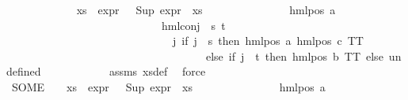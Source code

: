 \begin{isabellebody}
\ \ \ \ \ \ \isamarkupfalse%
\ {\isachardoublequoteopen}{\isacharbraceleft}{\kern0pt}{\isasympsi}\ {\isacharbar}{\kern0pt}\ {\isasympsi}{\isachardot}{\kern0pt}\ {\isasympsi}\ {\isasymin}\ xs\ {\isasymand}\ {\isacharparenleft}{\kern0pt}expr{\isacharunderscore}{\kern0pt}{}\ {\isasympsi}\ {\isacharequal}{\kern0pt}\ {\isacharparenleft}{\kern0pt}Sup\ {\isacharparenleft}{\kern0pt}expr{\isacharunderscore}{\kern0pt}{}\ {\isacharbackquote}{\kern0pt}\ xs{\isacharparenright}{\kern0pt}{\isacharparenright}{\kern0pt}{\isacharparenright}{\kern0pt}{\isacharbraceright}{\kern0pt}\ {\isacharequal}{\kern0pt}\isanewline
\ \ \ \ \ \ \ \ \ \ \ \ \ \ {\isacharbraceleft}{\kern0pt}{\isacharparenleft}{\kern0pt}hml{\isacharunderscore}{\kern0pt}pos\ a\isanewline
\ \ \ \ \ \ \ \ \ \ \ \ \ \ \ \ \ \ \ \ \ \ \ \ \ \ \ \ {\isacharparenleft}{\kern0pt}hml{\isacharunderscore}{\kern0pt}conj\ {\isacharbraceleft}{\kern0pt}{\isacharbraceright}{\kern0pt}\ {\isacharbraceleft}{\kern0pt}s{\isacharcomma}{\kern0pt}\ t{\isacharbraceright}{\kern0pt}\isanewline
\ \ \ \ \ \ \ \ \ \ \ \ \ \ \ \ \ \ \ \ \ \ \ \ \ \ \ \ \ \ {\isacharparenleft}{\kern0pt}{\isasymlambda}j{\isachardot}{\kern0pt}\ if\ j\ {\isacharequal}{\kern0pt}\ s\ then\ hml{\isacharunderscore}{\kern0pt}pos\ a\ {\isacharparenleft}{\kern0pt}hml{\isacharunderscore}{\kern0pt}pos\ c\ TT{\isacharparenright}{\kern0pt}\isanewline
\ \ \ \ \ \ \ \ \ \ \ \ \ \ \ \ \ \ \ \ \ \ \ \ \ \ \ \ \ \ \ \ \ \ \ \ else\ if\ j\ {\isacharequal}{\kern0pt}\ t\ then\ hml{\isacharunderscore}{\kern0pt}pos\ b\ TT\ else\ undefined{\isacharparenright}{\kern0pt}{\isacharparenright}{\kern0pt}{\isacharparenright}{\kern0pt}{\isacharbraceright}{\kern0pt}{\isachardoublequoteclose}\isanewline
\ \ \ \ \ \ \ \ \isamarkupfalse%
\ {}\ {}\ assms{\isacharparenleft}{\kern0pt}{}{\isacharparenright}{\kern0pt}\ xs{\isacharunderscore}{\kern0pt}def\ \isamarkupfalse%
\ force\isanewline
\ \ \ \ \ \ \isamarkupfalse%
\ {\isachardoublequoteopen}{\isacharparenleft}{\kern0pt}SOME\ {\isasympsi}{\isachardot}{\kern0pt}\ {\isasympsi}\ {\isasymin}\ xs\ {\isasymand}\ expr{\isacharunderscore}{\kern0pt}{}\ {\isasympsi}\ {\isacharequal}{\kern0pt}\ {\isacharparenleft}{\kern0pt}Sup\ {\isacharparenleft}{\kern0pt}expr{\isacharunderscore}{\kern0pt}{}\ {\isacharbackquote}{\kern0pt}\ xs{\isacharparenright}{\kern0pt}{\isacharparenright}{\kern0pt}{\isacharparenright}{\kern0pt}\ {\isacharequal}{\kern0pt}\isanewline
\ \ \ \ \ \ \ \ \ \ \ \ \ \ {\isacharparenleft}{\kern0pt}hml{\isacharunderscore}{\kern0pt}pos\ a\isanewline

\end{isabellebody}
